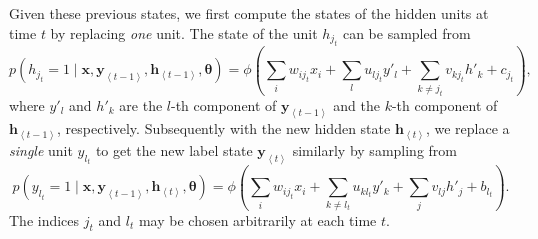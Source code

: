 \documentclass{now}
\newcommand{\qt}[1]{\left<#1\right>}
\newcommand{\vect}[1]{\mathbf{#1}}
\newcommand{\vects}[1]{\boldsymbol{#1}}
\newcommand{\vh}[0]{\vect{h}}
\newcommand{\vx}[0]{\vect{x}}
\newcommand{\vy}[0]{\vect{y}}
\newcommand{\TT}[0]{{\vects{\theta}}}
\begin{document}
Given these previous states, we first compute the states of
the hidden units at time $t$ by replacing \textit{one} unit.
The state of the unit $h_{j_t}$ can be sampled from
\[
p(h_{j_t} = 1 \mid \vx, \vy_{\qt{t-1}}, \vh_{\qt{t-1}}, \TT) = \phi\left( 
\sum_{i} w_{i{j_t}} x_{i} 
+ \sum_{l} u_{l{j_t}} y'_{l} 
+ \sum_{k \neq {j_t}} v_{k{j_t}} h'_k 
+ c_{j_t} \right),
\]
where $y'_l$ and $h'_k$ are the $l$-th component of
$\vy_{\qt{t-1}}$ and the $k$-th component of $\vh_{\qt{t-1}}$,
respectively. Subsequently with the new hidden state
$\vh_{\qt{t}}$, we replace a \textit{single} unit $y_{l_t}$ to
get the new label state $\vy_{\qt{t}}$ similarly by sampling
from
\[
p(y_{l_t} = 1 \mid \vx, \vy_{\qt{t-1}}, \vh_{\qt{t}}, \TT) = \phi\left( 
\sum_{i} w_{i{j_t}} x_{i} 
+ \sum_{k \neq l_t} u_{k{l_t}} y'_{k} 
+ \sum_{j} v_{lj} h'_j 
+ b_{l_t} \right).
\]
The indices $j_t$ and $l_t$ may be chosen arbitrarily at
each time $t$. 
\end{document}
